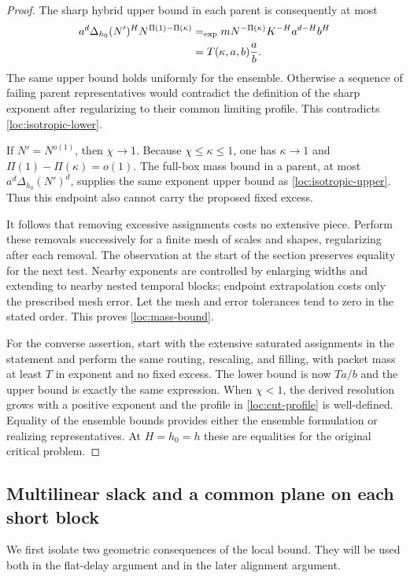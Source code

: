 \begin{proof}
The sharp hybrid upper bound in each parent is consequently at most
\begin{align}
 a^d\Delta_{h_0}(N')^H
       N^{\Pi(1)-\Pi(\kappa)}
 &\mathrel{=_{\mathrm{exp}}} mN^{-\Pi(\kappa)}K^{-H}a^{d-H}b^H \notag\\
 &=T(\kappa,a,b)\frac{a}{b}.
 \label{loc:isotropic-upper}
\end{align}
The same upper bound holds uniformly for the ensemble.  Otherwise a
sequence of failing parent representatives would contradict the
definition of the sharp exponent after regularizing to their common
limiting profile.  This contradicts
\eqref{loc:isotropic-lower}.

If $N'=N^{o(1)}$, then $\chi\to1$.  Because
$\chi\leq\kappa\leq1$, one has $\kappa\to1$ and
$\Pi(1)-\Pi(\kappa)=o(1)$.  The full-box mass bound in a parent,
at most $a^d\Delta_{h_0}(N')^d$, supplies the same exponent upper
bound as \eqref{loc:isotropic-upper}.  Thus this endpoint also cannot
carry the proposed fixed excess.

It follows that removing excessive assignments costs no extensive
piece.  Perform these removals successively for a finite mesh of
scales and shapes, regularizing after each removal.  The observation
at the start of the section preserves equality for the next test.
Nearby exponents are controlled by enlarging widths and extending to
nearby nested temporal blocks; endpoint extrapolation costs only the
prescribed mesh error.  Let the mesh and error tolerances tend to
zero in the stated order.  This proves \eqref{loc:mass-bound}.

For the converse assertion, start with the extensive saturated
assignments in the statement and perform the same routing, rescaling,
and filling, with packet mass at least $T$ in exponent and no fixed
excess.  The lower bound is now $Ta/b$ and the upper bound is exactly
the same expression.  When $\chi<1$, the derived resolution grows with a
positive exponent and the profile in \eqref{loc:cut-profile} is
well-defined.  Equality of the ensemble bounds provides either the
ensemble formulation or realizing representatives.  At $H=h_0=h$
these are equalities for the original critical problem.
\end{proof}

\subsection{Multilinear slack and a common plane on each short block}

We first isolate two geometric consequences of the local bound.  They
will be used both in the flat-delay argument and in the later alignment
argument.

